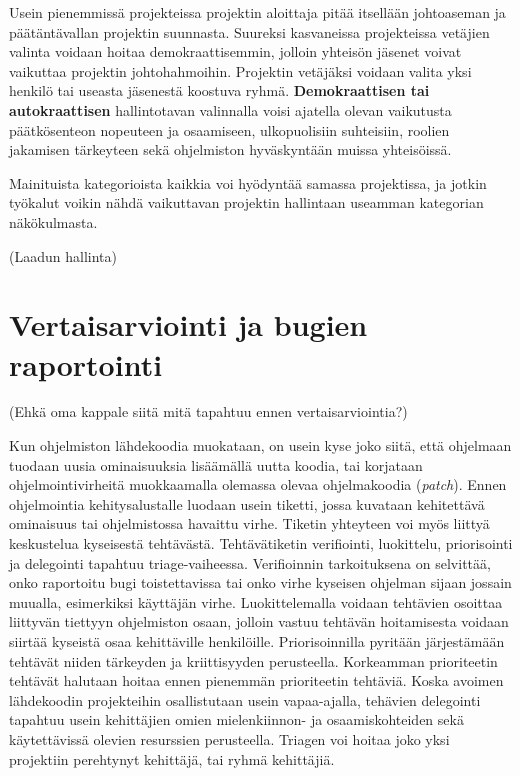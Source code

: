 \documentclass[utf8]{gradu3}
\begin{document}
Usein pienemmissä projekteissa projektin aloittaja pitää itsellään johtoaseman
ja päätäntävallan projektin suunnasta. Suureksi kasvaneissa projekteissa
vetäjien valinta voidaan hoitaa demokraattisemmin, jolloin yhteisön jäsenet
voivat vaikuttaa projektin johtohahmoihin. Projektin vetäjäksi voidaan valita
yksi henkilö tai useasta jäsenestä koostuva ryhmä. \textbf{Demokraattisen tai
autokraattisen} hallintotavan valinnalla voisi ajatella olevan vaikutusta
päätkösenteon nopeuteen ja osaamiseen, ulkopuolisiin suhteisiin, roolien
jakamisen tärkeyteen sekä ohjelmiston hyväskyntään muissa yhteisöissä.%

Mainituista kategorioista kaikkia voi hyödyntää samassa projektissa, ja jotkin
työkalut voikin nähdä vaikuttavan projektin hallintaan useamman kategorian
näkökulmasta.



(Laadun hallinta)

\section{Vertaisarviointi ja bugien raportointi}
(Ehkä oma kappale siitä mitä tapahtuu ennen vertaisarviointia?)

Kun ohjelmiston lähdekoodia muokataan, on usein kyse joko siitä, että ohjelmaan
tuodaan uusia ominaisuuksia lisäämällä uutta koodia, tai korjataan
ohjelmointivirheitä muokkaamalla olemassa olevaa ohjelmakoodia (\textit{patch}).
Ennen ohjelmointia kehitysalustalle luodaan usein tiketti, jossa kuvataan
kehitettävä ominaisuus tai ohjelmistossa havaittu virhe. Tiketin yhteyteen voi
myös liittyä keskustelua kyseisestä tehtävästä.%
Tehtävätiketin verifiointi, luokittelu, priorisointi ja delegointi tapahtuu
triage-vaiheessa.%
Verifioinnin tarkoituksena on selvittää, onko raportoitu bugi toistettavissa tai
onko virhe kyseisen ohjelman sijaan jossain muualla, esimerkiksi käyttäjän
virhe.%
Luokittelemalla voidaan tehtävien osoittaa liittyvän tiettyyn ohjelmiston osaan,
jolloin vastuu tehtävän hoitamisesta voidaan siirtää kyseistä osaa kehittäville
henkilöille.%
Priorisoinnilla pyritään järjestämään tehtävät niiden tärkeyden ja kriittisyyden
perusteella. Korkeamman prioriteetin tehtävät halutaan hoitaa ennen pienemmän
prioriteetin tehtäviä.%
Koska avoimen lähdekoodin projekteihin osallistutaan usein vapaa-ajalla,
tehävien delegointi tapahtuu usein kehittäjien omien mielenkiinnon- ja
osaamiskohteiden sekä käytettävissä olevien resurssien perusteella.%
Triagen voi hoitaa joko yksi projektiin perehtynyt kehittäjä, tai ryhmä
kehittäjiä. 
\end{document}
